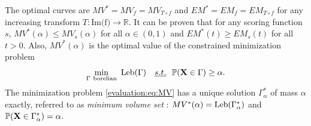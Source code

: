 The optimal curves are $MV^* = MV_f = MV_{T \circ f}$ and $EM^* = EM_f = EM_{T \circ f}$ for any increasing transform $T: \text{Im(f)} \to \mathbb{R}$. %
It can be proven \cite{CLEM13, AISTAT15} that for any scoring function $s$, $MV^*(\alpha)\leq MV_s(\alpha)$ for all $\alpha\in (0,1)$ and $EM^*(t) \ge EM_s(t)$ for all $t > 0$.
%
Also, $MV^*(\alpha)$ is the optimal value of the constrained minimization problem
\begin{equation}\label{evaluation:eq:MV}\min_{\Gamma~ \text{borelian}} ~\text{Leb}(\Gamma) ~~~\emph{s.t.}{}~~ \mathbb{P}(\mathbf X \in \Gamma) \ge \alpha.
\end{equation}
The minimization problem \eqref{evaluation:eq:MV} has a unique solution $\Gamma_\alpha^*$ of mass $\alpha$ exactly, referred to as \textit{minimum volume set} \cite{Polonik97}: $MV^*(\alpha)=\text{Leb}(\Gamma^*_\alpha)$ and $\mathbb{P}(\mathbf X \in \Gamma_\alpha^*)=\alpha$. 

